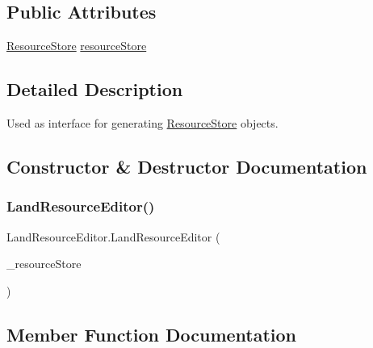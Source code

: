 \subsection*{Public Attributes}
\begin{DoxyCompactItemize}
\item 
\mbox{\hyperlink{class_resource_store}{Resource\+Store}} \mbox{\hyperlink{class_land_resource_editor_a5cde04313d283beee5f340a056b75bc2}{resource\+Store}}
\end{DoxyCompactItemize}


\subsection{Detailed Description}
Used as interface for generating \mbox{\hyperlink{class_resource_store}{Resource\+Store}} objects. 



\subsection{Constructor \& Destructor Documentation}
\mbox{\label{class_land_resource_editor_ac8aacd2b8ec7329ec261665c0068f356}} 
\subsubsection{\texorpdfstring{Land\+Resource\+Editor()}{LandResourceEditor()}}
{\footnotesize\ttfamily Land\+Resource\+Editor.\+Land\+Resource\+Editor (\begin{DoxyParamCaption}\item[{\mbox{\hyperlink{class_resource_store}{Resource\+Store}}}]{\+\_\+resource\+Store }\end{DoxyParamCaption})}



\subsection{Member Function Documentation}
\mbox{\label{class_land_resource_editor_a5390ac74d63e553c155fd515a6a035e0}} 
